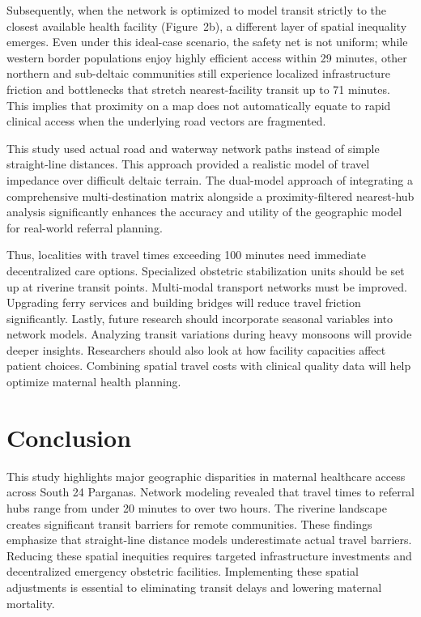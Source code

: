 \documentclass[10pt,twocolumn,letterpaper]{article}
\begin{document}
Subsequently, when the network is optimized to model transit strictly to the closest available health facility (Figure~2b), a different layer of spatial inequality emerges. Even under this ideal-case scenario, the safety net is not uniform; while western border populations enjoy highly efficient access within 29 minutes, other northern and sub-deltaic communities still experience localized infrastructure friction and bottlenecks that stretch nearest-facility transit up to 71 minutes. This implies that proximity on a map does not automatically equate to rapid clinical access when the underlying road vectors are fragmented.

This study used actual road and waterway network paths instead of simple straight-line distances. This approach provided a realistic model of travel impedance over difficult deltaic terrain. The dual-model approach of integrating a comprehensive multi-destination matrix alongside a proximity-filtered nearest-hub analysis significantly enhances the accuracy and utility of the geographic model for real-world referral planning.

Thus, localities with travel times exceeding 100 minutes need immediate decentralized care options. Specialized obstetric stabilization units should be set up at riverine transit points. Multi-modal transport networks must be improved. Upgrading ferry services and building bridges will reduce travel friction significantly. Lastly, future research should incorporate seasonal variables into network models. Analyzing transit variations during heavy monsoons will provide deeper insights. Researchers should also look at how facility capacities affect patient choices. Combining spatial travel costs with clinical quality data will help optimize maternal health planning.

\section{Conclusion}
This study highlights major geographic disparities in maternal healthcare access across South 24 Parganas. Network modeling revealed that travel times to referral hubs range from under 20 minutes to over two hours. The riverine landscape creates significant transit barriers for remote communities. These findings emphasize that straight-line distance models underestimate actual travel barriers. Reducing these spatial inequities requires targeted infrastructure investments and decentralized emergency obstetric facilities. Implementing these spatial adjustments is essential to eliminating transit delays and lowering maternal mortality.
\end{document}
